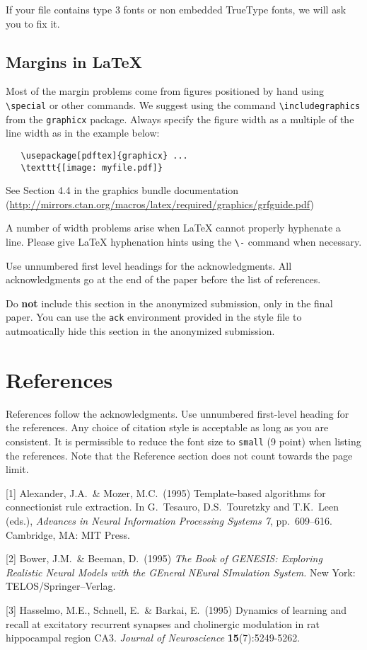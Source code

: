 \documentclass{article}
\begin{document}
  If your file contains type 3 fonts or non embedded TrueType fonts, we will ask
  you to fix it.

  \subsection{Margins in \LaTeX{}}

  Most of the margin problems come from figures positioned by hand using
  \verb+\special+ or other commands. We suggest using the command
  \verb+\includegraphics+ from the \verb+graphicx+ package. Always specify the
  figure width as a multiple of the line width as in the example below:
  \begin{verbatim}
   \usepackage[pdftex]{graphicx} ...
   \texttt{[image: myfile.pdf]}
  \end{verbatim}
  See Section 4.4 in the graphics bundle documentation
  (\url{http://mirrors.ctan.org/macros/latex/required/graphics/grfguide.pdf})

  A number of width problems arise when \LaTeX{} cannot properly hyphenate a
  line. Please give LaTeX hyphenation hints using the \verb+\-+ command when
  necessary.

  \begin{ack}
    Use unnumbered first level headings for the acknowledgments. All acknowledgments
    go at the end of the paper before the list of references.

    Do {\bf not} include this section in the anonymized submission, only in the final paper. You can use the \texttt{ack} environment provided in the style file to autmoatically hide this section in the anonymized submission.
  \end{ack}

  \section*{References}

  References follow the acknowledgments. Use unnumbered first-level heading for
  the references. Any choice of citation style is acceptable as long as you are
  consistent. It is permissible to reduce the font size to \verb+small+ (9 point)
  when listing the references.
  Note that the Reference section does not count towards the page limit.
  \medskip

  {
    \small

    [1] Alexander, J.A.\ \& Mozer, M.C.\ (1995) Template-based algorithms for
  connectionist rule extraction. In G.\ Tesauro, D.S.\ Touretzky and T.K.\ Leen
    (eds.), {\it Advances in Neural Information Processing Systems 7},
    pp.\ 609--616. Cambridge, MA: MIT Press.

    [2] Bower, J.M.\ \& Beeman, D.\ (1995) {\it The Book of GENESIS: Exploring
  Realistic Neural Models with the GEneral NEural SImulation System.}  New York:
  TELOS/Springer--Verlag.

    [3] Hasselmo, M.E., Schnell, E.\ \& Barkai, E.\ (1995) Dynamics of learning and
  recall at excitatory recurrent synapses and cholinergic modulation in rat
  hippocampal region CA3. {\it Journal of Neuroscience} {\bf 15}(7):5249-5262.
  }
\end{document}
